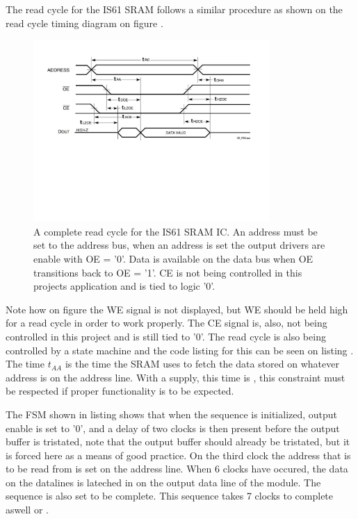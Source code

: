 The read cycle for the IS61 SRAM follows a similar procedure as shown on the read cycle timing diagram on figure .
\begin{figure}[H]
    \centering
    \includegraphics[clip, trim=0 250 0 0, width=0.8\textwidth]{Sections/7_SystemDesign/Figures/7_2_5_IS61_ReadCycle.pdf}
    \caption{A complete read cycle for the IS61 SRAM IC\cite{ISSISRAM}. An address must be set to the address bus, when an address is set the output drivers are enable with OE = '0'. Data is available on the data bus when OE transitions back to OE = '1'. CE is not being controlled in this projects application and is tied to logic '0'.}
    \label{fig:7_2_5_IS61_READ}
\end{figure}

Note how on figure  the WE signal is not displayed, but WE should be held high for a read cycle in order to work properly. The CE signal is, also, not being controlled in this project and is still tied to '0'. The read cycle is also being controlled by a state machine and the code listing for this can be seen on listing . The time $t_{AA}$ is the time the SRAM uses to fetch the data stored on whatever address is on the address line. With a  supply, this time is , this constraint must be respected if proper functionality is to be expected.


 

The FSM shown in listing   shows that when the sequence is initialized, output enable is set to '0', and a delay of two clocks is then present before the output buffer is tristated, note that the output buffer should already be tristated, but it is forced here as a means of good practice. On the third clock the address that is to be read from is set on the address line. When 6 clocks have occured, the data on the datalines is lateched in on the output data line of the module. The sequence is also set to be complete. This sequence takes 7 clocks to complete aswell or . 

